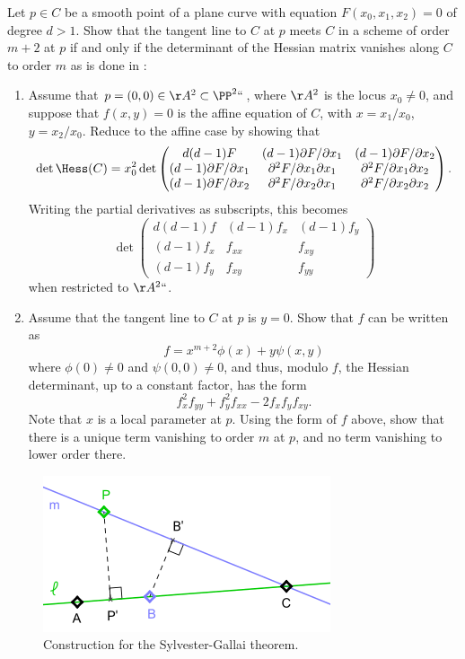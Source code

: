\begin{exercise}\label{Hessian exercise} 
Let $p\in C$ be a smooth point of a  plane curve with equation $F(x_0,x_1,x_2) = 0$ of degree $d>1$. Show that the tangent line to $C$ at $p$ meets
$C$ in a scheme of order $m+2$ at $p$ if and only if the determinant of the Hessian matrix vanishes
%
along $C$ to order $m$ as is done in \cite[pp.~84--85]{Kunz}:

\begin{enumerate}
\item Assume that $p = (0,0)\in \AA^2\subset \PP^2` `$, where $\AA^2$ is the locus $x_0\neq 0$, 
and suppose that $f(x,y) =0$ is the affine equation of $C$, with $x= x_1/x_0$, 
$y = x_2/x_0$.
Reduce to the affine case by showing that
$$
\det \Hess(C) =
x_0^2 \det 
\begin{pmatrix}
 d(d-1)F & (d-1) \partial F/\partial x_1 & (d-1) \partial F/\partial x_2 \\
 (d-1) \partial F/\partial x_1&\partial^2 F/\partial x_1 \partial x_1 & \partial^2 F/\partial x_1 \partial x_2\\
 (d-1) \partial F/\partial x_2 &\partial^2 F/\partial x_2 \partial x_1 & \partial^2 F/\partial x_2 \partial x_2 
\end{pmatrix} .
$$ 
Writing the partial derivatives as subscripts, this becomes
$$
\det \begin{pmatrix}
 d(d-1)f & (d-1) f_x & (d-1) f_y \\
 (d-1) f_x&f_{xx} & f_{xy}\\
 (d-1) f_y &f_{xy} & f_{yy}
\end{pmatrix}
$$ 
when restricted to $\AA^2` `$.

\item Assume that the tangent line to $C$ at $p$ is $y=0$. Show that $f$ can be written as
$$
f = x^{m+2}\phi(x) +y\psi(x,y)
$$
where $\phi(0) \neq 0$ and $\psi(0,0) \neq 0$, and thus, modulo $f$, the Hessian determinant,
up to a constant factor, 
has the form
$$
f_x^2f_{yy}+f_y^2f_{xx}-2f_xf_yf_{xy}.
$$
Note that $x$ is a local parameter at $p$. Using the form of $f$ above, show that there is a unique term vanishing to order $m$ at $p$,
and no term vanishing to lower order there.
\end{enumerate}
\end{exercise}

\begin{figure}
\inprogress
\centerline {\includegraphics[height=.75in]{"Sylvester_Gallai_Kelly_proof"}}
\caption{Construction for the Sylvester-Gallai theorem.}
\label{Fig4-S}
\end{figure}

